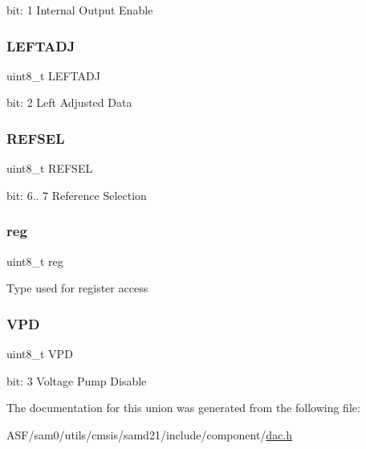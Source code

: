 bit\+: 1 Internal Output Enable \mbox{\label{union_d_a_c___c_t_r_l_b___type_a7ed2886f45e112aefa4cef7a8b2bb472}} 
\subsubsection{\texorpdfstring{LEFTADJ}{LEFTADJ}}
{\footnotesize\ttfamily uint8\+\_\+t L\+E\+F\+T\+A\+DJ}

bit\+: 2 Left Adjusted Data \mbox{\label{union_d_a_c___c_t_r_l_b___type_a31386ac97a08a22e5f39b0481794d58a}} 
\subsubsection{\texorpdfstring{REFSEL}{REFSEL}}
{\footnotesize\ttfamily uint8\+\_\+t R\+E\+F\+S\+EL}

bit\+: 6.. 7 Reference Selection \mbox{\label{union_d_a_c___c_t_r_l_b___type_a9428adc9af4653a2050e2536b55dec8d}} 
\subsubsection{\texorpdfstring{reg}{reg}}
{\footnotesize\ttfamily uint8\+\_\+t reg}

Type used for register access \mbox{\label{union_d_a_c___c_t_r_l_b___type_a8a5093ce0813524f115596f28e7ca694}} 
\subsubsection{\texorpdfstring{VPD}{VPD}}
{\footnotesize\ttfamily uint8\+\_\+t V\+PD}

bit\+: 3 Voltage Pump Disable 

The documentation for this union was generated from the following file\+:\begin{DoxyCompactItemize}
\item 
A\+S\+F/sam0/utils/cmsis/samd21/include/component/\mbox{\hyperlink{component_2dac_8h}{dac.\+h}}\end{DoxyCompactItemize}
